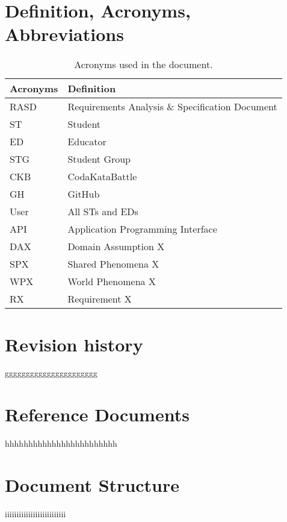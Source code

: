 \section{Definition, Acronyms, Abbreviations}
\label{sec:definition_acronyms_abbreviations}%
\begin{table}[H]
    \begin{center}
        \begin{tabular}{ |l|l| }
            \hline
            \textbf{Acronyms} & \textbf{Definition}                              \\
            \hline
            RASD             & Requirements Analysis \& Specification Document                      \\
            \hline
            ST              & Student                         \\
            \hline
            ED              & Educator                         \\
            \hline
            STG             & Student Group                    \\
            \hline
            CKB             & CodaKataBattle                   \\
            \hline
            GH              & GitHub                           \\
            \hline
            User              & All STs and EDs                           \\
            \hline
            API              & Application Programming Interface                           \\
            \hline
            DAX              & Domain Assumption X                           \\
            \hline
            SPX              & Shared Phenomena X                           \\
            \hline
            WPX              & World Phenomena X                           \\
            \hline
            RX              & Requirement X                           \\
            \hline
         \end{tabular}
        \caption{Acronyms used in the document.}
        \label{tab:acronyms}%
    \end{center}
\end{table}




\section{Revision history}
\label{sec:revision_history}%
gggggggggggggggggggggg

\section{Reference Documents}
\label{sec:reference_documents}%
hhhhhhhhhhhhhhhhhhhhhhhh

\section{Document Structure}
\label{sec:document_structure}%
iiiiiiiiiiiiiiiiiiiiiiiiii
